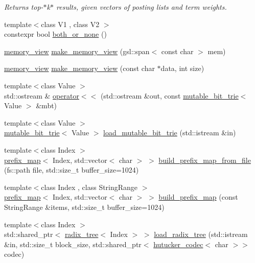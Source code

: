 \begin{DoxyCompactItemize}
\begin{DoxyCompactList}\small\item\em Returns top-\/$\ast$k$\ast$ results, given vectors of posting lists and term weights. \end{DoxyCompactList}\item 
{\footnotesize template$<$class V1 , class V2 $>$ }\\constexpr bool \mbox{\hyperlink{namespaceirk_abce08dade53e33dcfa31946305eee6ce}{both\+\_\+or\+\_\+none}} ()
\item 
\mbox{\hyperlink{classirk_1_1memory__view}{memory\+\_\+view}} \mbox{\hyperlink{namespaceirk_ac123106f771ea0ef0ee855f8ee98bc2b}{make\+\_\+memory\+\_\+view}} (gsl\+::span$<$ const char $>$ mem)
\item 
\mbox{\hyperlink{classirk_1_1memory__view}{memory\+\_\+view}} \mbox{\hyperlink{namespaceirk_ab21cb1ed22fd54ee08ae5d4e93485857}{make\+\_\+memory\+\_\+view}} (const char $\ast$data, int size)
\item 
{\footnotesize template$<$class Value $>$ }\\std\+::ostream \& \mbox{\hyperlink{namespaceirk_aac8001645bff72cf73bf0f87512c5ed4}{operator$<$$<$}} (std\+::ostream \&out, const \mbox{\hyperlink{classirk_1_1mutable__bit__trie}{mutable\+\_\+bit\+\_\+trie}}$<$ Value $>$ \&mbt)
\item 
{\footnotesize template$<$class Value $>$ }\\\mbox{\hyperlink{classirk_1_1mutable__bit__trie}{mutable\+\_\+bit\+\_\+trie}}$<$ Value $>$ \mbox{\hyperlink{namespaceirk_ae9440cb1246aeaa9376e8d9b678f64ba}{load\+\_\+mutable\+\_\+bit\+\_\+trie}} (std\+::istream \&in)
\item 
{\footnotesize template$<$class Index $>$ }\\\mbox{\hyperlink{classirk_1_1prefix__map}{prefix\+\_\+map}}$<$ Index, std\+::vector$<$ char $>$ $>$ \mbox{\hyperlink{namespaceirk_aae903af083f9e6a98e9d5f232322a2f2}{build\+\_\+prefix\+\_\+map\+\_\+from\+\_\+file}} (fs\+::path file, std\+::size\+\_\+t buffer\+\_\+size=1024)
\item 
{\footnotesize template$<$class Index , class String\+Range $>$ }\\\mbox{\hyperlink{classirk_1_1prefix__map}{prefix\+\_\+map}}$<$ Index, std\+::vector$<$ char $>$ $>$ \mbox{\hyperlink{namespaceirk_a9e498e43015b0fba26ed452bb2981d21}{build\+\_\+prefix\+\_\+map}} (const String\+Range \&items, std\+::size\+\_\+t buffer\+\_\+size=1024)
\item 
{\footnotesize template$<$class Index $>$ }\\std\+::shared\+\_\+ptr$<$ \mbox{\hyperlink{classirk_1_1radix__tree}{radix\+\_\+tree}}$<$ Index $>$ $>$ \mbox{\hyperlink{namespaceirk_a11724f6a30a7fb17f24d0941fa00568d}{load\+\_\+radix\+\_\+tree}} (std\+::istream \&in, std\+::size\+\_\+t block\+\_\+size, std\+::shared\+\_\+ptr$<$ \mbox{\hyperlink{classirk_1_1hutucker__codec}{hutucker\+\_\+codec}}$<$ char $>$$>$ codec)
$$
\end{DoxyCompactItemize}

